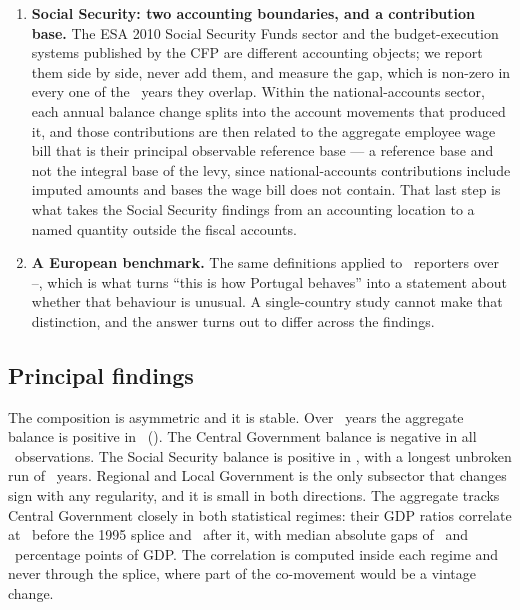 \begin{enumerate}
\item \textbf{Social Security: two accounting boundaries, and a contribution base.} The
ESA 2010 Social Security Funds sector and the budget-execution systems published by the
CFP are different accounting objects; we report them side by side, never add them, and
measure the gap, which is non-zero in every one of the \SsfBoundaryYears\ years they
overlap. Within the national-accounts sector, each annual balance change splits into the
account movements that produced it, and those contributions are then related to the
aggregate employee wage bill that is their principal observable reference base --- a
reference base and not the integral base of the levy, since national-accounts
contributions include imputed amounts and bases the wage bill does not contain. That last
step is what takes the Social Security
findings from an accounting location to a named quantity outside the fiscal accounts.

\item \textbf{A European benchmark.} The same definitions applied to
\BenchmarkCountries\ reporters over \BenchmarkStart--\BenchmarkEnd, which is what turns
``this is how Portugal behaves'' into a statement about whether that behaviour is
unusual. A single-country study cannot make that distinction, and the answer turns out
to differ across the findings.
\end{enumerate}

\subsection{Principal findings}

The composition is asymmetric and it is stable. Over \PanelYears\ years the
aggregate balance is positive in \NumPositiveYears\
(\PositiveYearList). The Central Government balance is negative in all
\CentralNegativeYears\ observations. The Social Security balance is positive in
\SsfPositiveYears, with a longest unbroken run of \SsfLongestPositiveRun\ years.
Regional and Local Government is the only subsector that changes sign with any
regularity, and it is small in both directions. The aggregate tracks Central
Government closely in both statistical regimes: their GDP ratios correlate at
\HistoricalTrackingCorrelation\ before the 1995 splice and \ModernTrackingCorrelation\
after it, with median absolute gaps of \HistoricalTrackingGap\ and \ModernTrackingGap\
percentage points of GDP. The correlation is computed inside each regime and never
through the splice, where part of the co-movement would be a vintage change.

